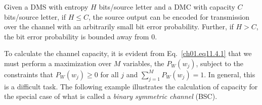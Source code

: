 \begin{theorem}
\label{ch01.th11.4.1}
Given a DMS
with entropy $H$ bits/source letter and a DMC with capacity $C$
bits/source letter,
if $H \leq C$, the source output can be encoded for transmission over
the channel with
an arbitrarily small bit error probability. Further, if $H > C$, the bit error
probability is bounded away from $0$.
\end{theorem}

To calculate the channel capacity, it is evident from
Eq.~\eqref{ch01.eq11.4.1} that we must
perform a maximization over $M$ variables, the $P_W(w_j)$, subject to
the constraints
that $ P_W (w_j) \geq 0 $ for all $j$ and $\sum^M_{j=1} P_W (w_j) = 1 $.
In general, this is a difficult task.
The following example illustrates  the calculation of capacity for the
special case
of what is called a \textit{binary symmetric channel} (BSC).

